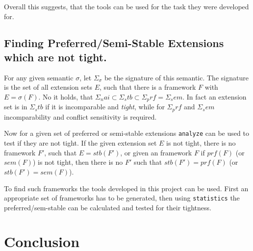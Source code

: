 \documentclass[parskip=half]{scrartcl}
\begin{document}
Overall this suggests, that the tools can be used for the task they were
developed for.

\subsection{Finding Preferred/Semi-Stable Extensions which are not tight.}

For any given semantic $\sigma$, let $\Sigma_\sigma$ be the signature of this
semantic. The signature is the set of all extension sets $E$, such that there is a
framework $F$ with $E=\sigma(F)$. No it holds, that $\Sigma_nai\subset
\Sigma_stb\subset\Sigma_prf=\Sigma_sem$. In fact an extension set is in $\Sigma_stb$
if it is incomparable and \emph{tight}, while for $\Sigma_prf$ and $\Sigma_sem$
incomparability and conflict sensitivity is required.

Now for a given set of preferred or semi-stable extensions \texttt{analyze} can be used
to test if they are not tight. If the given extension set $E$ is not tight, there is
no framework $F'$, such that $E=stb(F')$, or given an framework $F$ if $prf(F)$ (or $sem(F)$)
is not tight, then there is no $F'$ such that $stb(F')=prf(F)$ (or $stb(F')=sem(F)$).

To find such frameworks the tools developed in this project can be used. First an
appropriate set of frameworks has to be generated, then using \texttt{statistics} the
preferred/sem-stable can be calculated and tested for their tightness.

\section{Conclusion}
\label{conclusion}

\printbibliography
\end{document}
